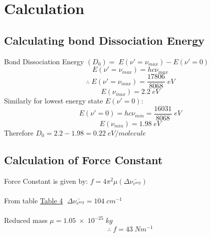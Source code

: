 \section{Calculation}

    \subsection{Calculating bond Dissociation Energy}
    Bond Dissociation Energy $(D_0)=\;E(\nu'=\nu_{max})-E(\nu'=0)$\\
    \[E(\nu'=\nu_{max})=hc\nu_{max}\]
    \[\therefore\;E(\nu'=\nu_{max})=\frac{17806}{8068}\;eV\]
    \[E(\nu_{max})=2.2\;eV\]
    Similarly for lowest energy state $E(\nu'=0)$:\\
    \[E(\nu'=0)=hc\nu_{min}=\frac{16031}{8068}\;eV\]
    \[E(\nu_{min})=1.98\;eV\]
    Therefore $D_0 = 2.2 - 1.98 = 0.22\;eV/molecule$\\

    \subsection{Calculation of Force Constant}
    \noindent Force Constant is given by: $f=4\pi^2 \mu(\Delta\bar{\nu_{e^{avg}}})$\\\\
    From table \hyperref[tab:iodine]{Table 4} $\;\Delta\bar{\nu_{e^{avg}}} = 104\;cm^{-1}$\\\\
    Reduced mass $\mu= 1.05\; \times\; 10^{-25}\; kg $\\
    \[\therefore\;f=43\;N m^{-1}\]
